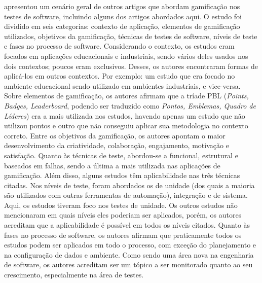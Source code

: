 \documentclass[twoside,english,brazilian]{UNISINOSartigo}
\begin{document}
\cite{DeJesus} apresentou um cenário geral de outros artigos que abordam gamificação nos testes de software, incluindo alguns dos artigos abordados aqui. O estudo foi dividido em seis categorias: contexto de aplicação, elementos de gamificação utilizados, objetivos da gamificação, técnicas de testes de software, níveis de teste e fases no processo de software. Considerando o contexto, os estudos eram focados em aplicações educacionais e industriais, sendo vários deles usados nos dois contextos; poucos eram exclusivos. Desses, os autores encontraram formas de aplicá-los em outros contextos. Por exemplo: um estudo que era focado no ambiente educacional sendo utilizado em ambientes industriais, e vice-versa. Sobre elementos de gamificação, os autores afirmam que a tríade PBL (\textit{Points, Badges, Leaderboard}, podendo ser traduzido como \textit{Pontos, Emblemas, Quadro de Líderes}) era a mais utilizada nos estudos, havendo apenas um estudo que não utilizou pontos e outro que não conseguiu aplicar sua metodologia no contexto correto. Entre os objetivos da gamificação, os autores apontam o maior desenvolvimento da criatividade, colaboração, engajamento, motivação e satisfação. Quanto às técnicas de teste, abordou-se a funcional, estrutural e baseados em falhas, sendo a última a mais utilizada nas aplicações de gamificação. Além disso, alguns estudos têm aplicabilidade nas três técnicas citadas. Nos níveis de teste, foram abordados os de unidade (dos quais a maioria são utilizados com outras ferramentas de automação), integração e de sistema. Aqui, os estudos tiveram foco nos testes de unidade. Os outros estudos não mencionaram em quais níveis eles poderiam ser aplicados, porém, os autores acreditam que a aplicabilidade é possível em todos os níveis citados. Quanto às fases no processo de software, os autores afirmam que praticamente todos os estudos podem ser aplicados em todo o processo, com exceção do planejamento e na configuração de dados e ambiente. Como sendo uma área nova na engenharia de software, os autores acreditam ser um tópico a ser monitorado quanto ao seu crescimento, especialmente na área de testes. 
\end{document}

